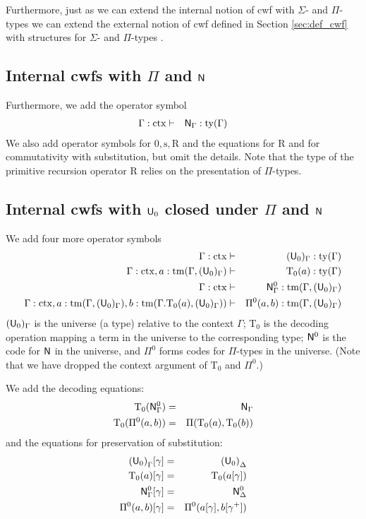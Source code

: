 \documentclass{mscs}
\newcommand{\FYI}[1]{{#1}}
\newcommand{\s}{\mathrm{s}}
\newcommand{\Rec}{\mathrm{R}}
\newcommand{\Ta}{\mathrm{T}}
\newcommand{\ctx}{\mathrm{ctx}}
\newcommand{\ty}{\mathrm{ty}}
\newcommand{\tm}{\mathrm{tm}}
\begin{document}
\begin{remark}
Furthermore, just as we can extend the internal notion of cwf with $\Sigma$- and $\Pi$-types we can extend the external notion of cwf defined in Section \ref{sec:def_cwf} with structures for $\Sigma$- and $\Pi$-types \cite{castellan:tlca2015,castellan:lmcs}.
\end{remark}

\subsection{Internal cwfs with $\Pi$ and $\mathsf{N}$}
Furthermore, we add the operator symbol
\begin{eqnarray*}
\Gamma : \ctx &\vdash& \N_\Gamma : \ty(\Gamma)
\end{eqnarray*}
We also add operator symbols for $0, \s, \Rec$ and the equations for $\Rec$ and for commutativity with substitution, but omit the details. Note that the type of the primitive recursion operator $\Rec$ relies on the \FYI{presentation of} $\Pi$-types.

\subsection{Internal cwfs with $\mathsf{U}_0$ closed under $\Pi$ and $\mathsf{N}$}\label{sec:u-example}
We add four more operator symbols
\begin{eqnarray*}
\Gamma : \ctx &\vdash& (\U_0)_\Gamma : \ty(\Gamma)\\
\Gamma : \ctx, a : \tm(\Gamma,(\U_0)_\Gamma) &\vdash& {\Ta_0}(a) : \ty(\Gamma)\\
\Gamma : \ctx &\vdash& \N^0_\Gamma : \tm(\Gamma,(\U_0)_\Gamma) \\
\Gamma : \ctx,
a : \tm(\Gamma,(\U_0)_\Gamma),
b :  \tm(\Gamma  .  \Ta_0(a), (\U_0)_\Gamma))
&\vdash&
 \Pi^0(a,b) : \tm(\Gamma,(\U_0)_\Gamma)
\end{eqnarray*}
$(\mathsf{U}_0)_\Gamma$ is the universe (a type) relative to the context $\Gamma$; $\Ta_0$ is the decoding operation mapping a term in the universe to the corresponding type; $\mathsf{N}^0$ is the code for $\mathsf{N}$ in the universe, and $\Pi^0$ forms codes for $\Pi$-types in the
 universe. (Note that we have dropped the context argument of $\Ta_0$ and $\Pi^0$.)

We add the decoding equations:
\begin{eqnarray*}
\Ta_0(\N^0_\Gamma) &=& \N_\Gamma\\
\Ta_0(\Pi^0(a,b)) &=& \Pi(\Ta_0(a),\Ta_0(b))
\end{eqnarray*}
and the equations for preservation of substitution:
\begin{eqnarray*}
{(\U_0)}_\Gamma [ \gamma ] &=& {(\U_0)}_\Delta\\
\Ta_0(a) [ \gamma ] &=& \Ta_0(a[ \gamma ] )\\
\N^0_\Gamma [ \gamma ] &=&\N^0_\Delta\\
\Pi^0(a,b)[ \gamma ] &=& \Pi^0(a [ \gamma ], b[ \gamma^+ ])
\end{eqnarray*}
\end{document}
